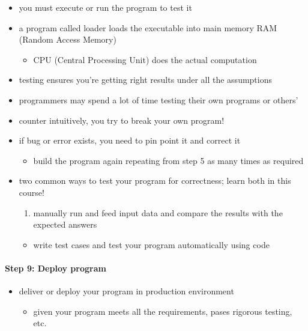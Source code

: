 \documentclass[11pt]{article}
\providecommand{\tightlist}{%
      \setlength{\itemsep}{0pt}\setlength{\parskip}{0pt}}
\begin{document}
\begin{itemize}
\tightlist
\item
  you must execute or run the program to test it
\item
  a program called loader loads the executable into main memory RAM
  (Random Access Memory)

  \begin{itemize}
  \tightlist
  \item
    CPU (Central Processing Unit) does the actual computation
  \end{itemize}
\item
  testing ensures you're getting right results under all the assumptions
\item
  programmers may spend a lot of time testing their own programs or
  others'
\item
  counter intuitively, you try to break your own program!
\item
  if bug or error exists, you need to pin point it and correct it

  \begin{itemize}
  \tightlist
  \item
    build the program again repeating from step 5 as many times as
    required
  \end{itemize}
\item
  two common ways to test your program for correctness; learn both in
  this course!

  \begin{enumerate}
  \def\labelenumi{\arabic{enumi}.}
  \tightlist
  \item
    manually run and feed input data and compare the results with the
    expected answers
  \end{enumerate}

  \begin{itemize}
  \tightlist
  \item
    write test cases and test your program automatically using code
  \end{itemize}
\end{itemize}

\hypertarget{step-9-deploy-program}{%
\paragraph{Step 9: Deploy program}\label{step-9-deploy-program}}

\begin{itemize}
\tightlist
\item
  deliver or deploy your program in production environment

  \begin{itemize}
  \tightlist
  \item
    given your program meets all the requirements, pases rigorous
    testing, etc.
  \end{itemize}
\end{itemize}
\end{document}
